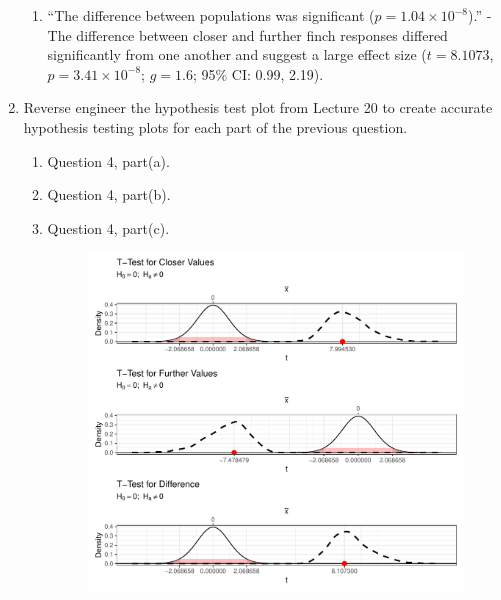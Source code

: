 \documentclass{article}\usepackage[]{graphicx}\usepackage[]{xcolor}
\begin{document}
\begin{enumerate}
\begin{enumerate}
  \item ``The difference between populations was significant ($p=1.04 \times10^{-8}$).'' - The difference between closer and further finch responses differed significantly from one another and suggest a large effect size ($t=8.1073$, $p=3.41 \times  10^{-8}$; $g=1.6$; 95\% CI: 0.99, 2.19).
\end{enumerate}
\item Reverse engineer the hypothesis test plot from Lecture 20 to create accurate
hypothesis testing plots for each part of the previous question.
\begin{enumerate}
  \item Question 4, part(a).
  \item Question 4, part(b).
  \item Question 4, part(c).
  \begin{figure}[H]
\begin{center}
\includegraphics[scale=0.5]{Rplot.pdf}
\label{plot2}
\end{center}
\end{figure}
\end{enumerate}
\end{enumerate}



\end{document}
